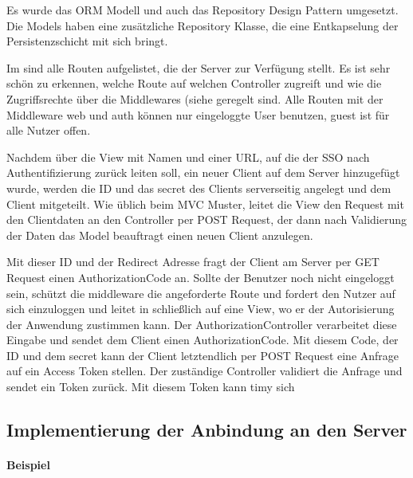 Es wurde das ORM Modell und auch das Repository Design Pattern umgesetzt. Die Models haben eine zusätzliche  Repository Klasse, die eine Entkapselung der Persistenzschicht mit sich bringt.

Im  sind alle Routen aufgelistet, die der Server zur Verfügung stellt. Es ist sehr schön zu erkennen, welche Route auf welchen Controller zugreift und wie die Zugriffsrechte über die Middlewares (siehe  geregelt sind. Alle Routen mit der Middleware web und auth können nur eingeloggte User benutzen, guest ist für alle Nutzer offen.

Nachdem über die View mit Namen und einer URL, auf die der SSO nach Authentifizierung zurück leiten soll, ein neuer Client auf dem Server hinzugefügt wurde, werden die ID und das secret des Clients serverseitig angelegt und dem Client mitgeteilt. Wie üblich beim MVC Muster, leitet die View den Request mit den Clientdaten an den Controller per POST Request, der dann nach Validierung der Daten das Model beauftragt einen neuen Client anzulegen. 

Mit dieser ID und der Redirect Adresse fragt der Client am Server per GET Request einen AuthorizationCode an. Sollte der Benutzer noch nicht eingeloggt sein, schützt die middleware die angeforderte Route und fordert den Nutzer auf sich einzuloggen und leitet in schließlich auf eine View, wo er der Autorisierung der Anwendung zustimmen kann. Der AuthorizationController verarbeitet diese Eingabe und sendet dem Client einen AuthorizationCode. Mit diesem Code, der ID und dem secret kann der Client letztendlich per POST Request eine Anfrage auf ein Access Token stellen. Der zuständige Controller validiert die Anfrage und sendet ein Token zurück. Mit diesem Token kann timy sich 




\subsection{Implementierung der Anbindung an den Server}
\label{sec:ImplementierungCient}


\paragraph{Beispiel}


